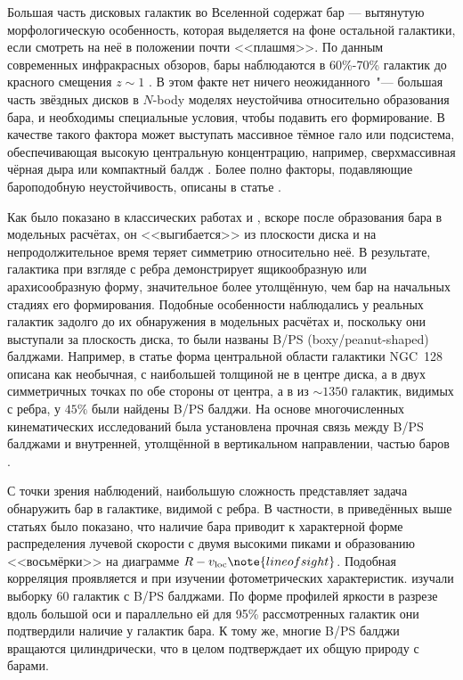 \documentclass{trlnotes}
\begin{document}
Большая часть дисковых галактик во Вселенной содержат бар --- вытянутую морфологическую особенность, которая выделяется на фоне остальной галактики, если смотреть на неё в положении почти <<плашмя>>. По данным современных инфракрасных обзоров, бары наблюдаются в 60\%-70\% галактик до красного смещения $z\sim 1$ \citep{marinova2007}.  В этом факте нет ничего неожиданного~"--- большая часть звёздных дисков в $N$-body моделях неустойчива относительно образования бара, и необходимы специальные условия, чтобы подавить его формирование. В качестве такого фактора может выступать массивное тёмное гало или подсистема, обеспечивающая высокую центральную концентрацию, например, сверхмассивная чёрная дыра \citep{shen2004} или компактный балдж \citep{saha2018}. Более полно факторы, подавляющие бароподобную неустойчивость, описаны в статье \citet{sellwood2019}.

Как было показано в классических работах \citet{combes1981a} и \citet{raha1991}, вскоре после образования бара в модельных расчётах, он <<выгибается>> из плоскости диска и на непродолжительное время теряет симметрию относительно неё. В результате, галактика при взгляде с ребра демонстрирует ящикообразную или арахисообразную форму, значительное более утолщённую, чем бар на начальных стадиях его формирования. Подобные особенности наблюдались у реальных галактик задолго до их обнаружения в модельных расчётах и, поскольку они выступали за плоскость диска, то были названы B/PS (boxy/peanut-shaped) балджами. Например, в статье \citet{burbidge1959} форма центральной области галактики NGC~128 описана как необычная, с наибольшей толщиной не в центре диска, а в двух симметричных точках по обе стороны от центра, а в \citet{lutticke2000} из $\sim\!1350$ галактик, видимых с ребра, у $45\%$ были найдены B/PS балджи.  На основе многочисленных кинематических исследований была установлена прочная связь между B/PS балджами и внутренней, утолщённой в вертикальном направлении, частью баров \citep{kuijken1995,bureau1999,chung2004,bureau2006}. 

С точки зрения наблюдений, наибольшую сложность представляет задача обнаружить бар в галактике, видимой с ребра. В частности, в приведённых выше статьях было показано, что наличие бара приводит к характерной форме распределения лучевой скорости с двумя высокими пиками и образованию <<восьмёрки>> на диаграмме $R - v_{\text{loc}}\note{line of sight}$.  Подобная корреляция проявляется и при изучении фотометрических характеристик. \citet{lutticke2000a} изучали выборку 60 галактик с B/PS балджами. По форме профилей яркости в разрезе вдоль большой оси и параллельно ей для 95\% рассмотренных галактик они  подтвердили наличие у галактик бара.  К тому же, многие B/PS балджи вращаются цилиндрически, что в целом подтверждает их общую природу с барами. 
 
\end{document}
